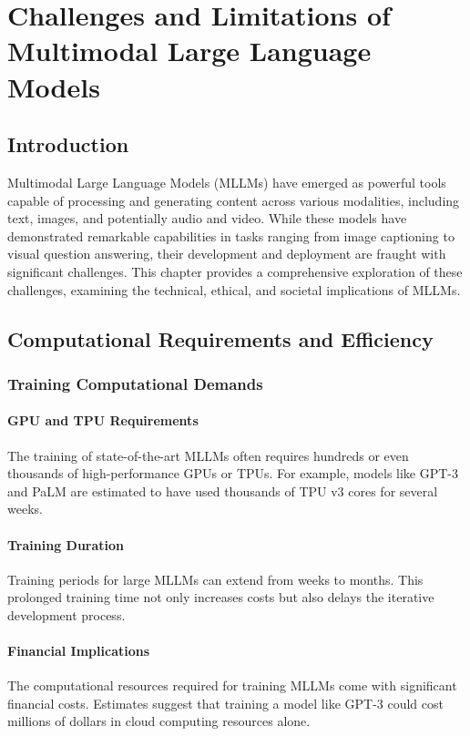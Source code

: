 \chapter{Challenges and Limitations of Multimodal Large Language Models}

\section{Introduction}
Multimodal Large Language Models (MLLMs) have emerged as powerful tools capable of processing and generating content across various modalities, including text, images, and potentially audio and video. While these models have demonstrated remarkable capabilities in tasks ranging from image captioning to visual question answering, their development and deployment are fraught with significant challenges. This chapter provides a comprehensive exploration of these challenges, examining the technical, ethical, and societal implications of MLLMs.

\section{Computational Requirements and Efficiency}

\subsection{Training Computational Demands}
\subsubsection{GPU and TPU Requirements}
The training of state-of-the-art MLLMs often requires hundreds or even thousands of high-performance GPUs or TPUs. For example, models like GPT-3 and PaLM are estimated to have used thousands of TPU v3 cores for several weeks.

\subsubsection{Training Duration}
Training periods for large MLLMs can extend from weeks to months. This prolonged training time not only increases costs but also delays the iterative development process.

\subsubsection{Financial Implications}
The computational resources required for training MLLMs come with significant financial costs. Estimates suggest that training a model like GPT-3 could cost millions of dollars in cloud computing resources alone.

